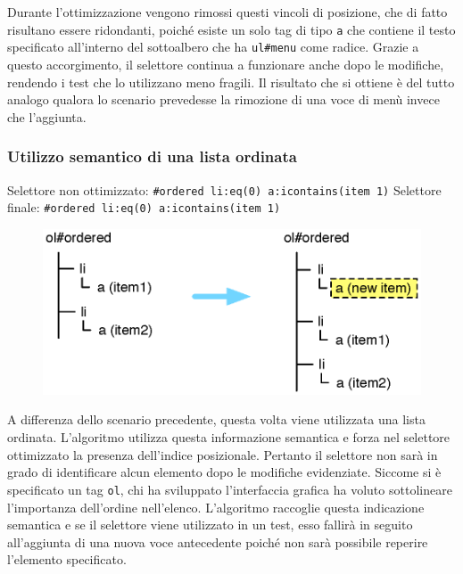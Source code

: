 Durante l'ottimizzazione vengono rimossi questi vincoli di posizione, che di fatto risultano essere ridondanti, poiché esiste un solo tag di tipo \verb|a| che contiene il testo specificato all'interno del sottoalbero che ha \verb|ul#menu| come radice. Grazie a questo accorgimento, il selettore continua  a funzionare anche dopo le modifiche, rendendo i test che lo utilizzano meno fragili. Il risultato che si ottiene è del tutto analogo qualora lo scenario prevedesse la rimozione di una voce di menù invece che l'aggiunta.

\subsubsection {Utilizzo semantico di una lista ordinata}

Selettore non ottimizzato:  \verb|#ordered li:eq(0) a:icontains(item 1)| 
\newline
Selettore finale:  \verb|#ordered li:eq(0) a:icontains(item 1)| 

\begin{figure}[htbp]
\begin{center}
\includegraphics[width=\textwidth]{images/dom_examples/ordered_menu.eps}
\end{center}
\end{figure}

A differenza dello scenario precedente, questa volta viene utilizzata una lista ordinata. L'algoritmo utilizza questa informazione semantica e forza nel selettore ottimizzato la presenza dell'indice posizionale. Pertanto il selettore non sarà in grado di identificare alcun elemento dopo le modifiche evidenziate. Siccome si è specificato un tag \verb|ol|, chi ha sviluppato l'interfaccia grafica ha voluto sottolineare l'importanza dell'ordine nell'elenco. L'algoritmo raccoglie questa indicazione semantica e se il selettore viene utilizzato in un test, esso fallirà in seguito all'aggiunta di una nuova voce antecedente poiché non sarà possibile reperire l'elemento specificato.

